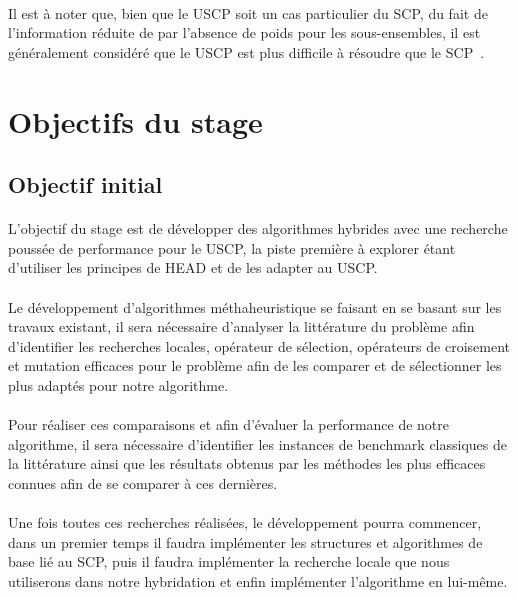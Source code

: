 \documentclass[a4paper,11pt,twoside,french,report]{../common/simplem}
\begin{document}
				\paragraph*{}
					Il est à noter que, bien que le \gls{USCP} soit un cas particulier du \gls{SCP}, du fait de l'information réduite de par l'absence de poids pour les sous-ensembles, il est généralement considéré que le \gls{USCP} est plus difficile à résoudre que le \gls{SCP}~\cite{Yelbay2015}.
		\section{Objectifs du stage}
			\subsection{Objectif initial}
				\paragraph*{}
					L'objectif du stage est de développer des algorithmes hybrides avec une recherche poussée de performance pour le \gls{USCP}, la piste première à explorer étant d'utiliser les principes de \gls{HEAD} et de les adapter au \gls{USCP}.
				\paragraph*{}
					Le développement d'algorithmes méthaheuristique se faisant en se basant sur les travaux existant, il sera nécessaire d'analyser la littérature du problème afin d'identifier les recherches locales, opérateur de sélection, opérateurs de croisement et mutation efficaces pour le problème afin de les comparer et de sélectionner les plus adaptés pour notre algorithme.
				\paragraph*{}
					Pour réaliser ces comparaisons et afin d'évaluer la performance de notre algorithme, il sera nécessaire d'identifier les instances de benchmark classiques de la littérature ainsi que les résultats obtenus par les méthodes les plus efficaces connues afin de se comparer à ces dernières.
				\paragraph*{}
					Une fois toutes ces recherches réalisées, le développement pourra commencer, dans un premier temps il faudra implémenter les structures et algorithmes de base lié au \gls{SCP}, puis il faudra implémenter la recherche locale que nous utiliserons dans notre hybridation et enfin implémenter l'algorithme en lui-même.
\end{document}
